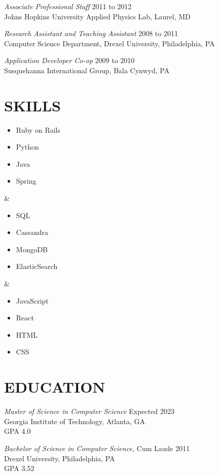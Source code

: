 \documentclass[line]{style}
\begin{document}
\begin{resume}
{\sl Associate Professional Staff} \hfill 2011 to 2012 \\
Johns Hopkins University Applied Physics Lab, Laurel, MD

{\sl Research Assistant and Teaching Assistant} \hfill 2008 to 2011 \\
Computer Science Department, Drexel University, Philadelphia, PA

{\sl Application Developer Co-op} \hfill        2009 to 2010 \\
Susquehanna International Group, Bala Cynwyd, PA

\section{SKILLS}
\begin{ncolumn}{3}
\begin{itemize} \itemsep -2pt
\item Ruby on Rails
\item Python
\item Java
\item Spring
\end{itemize}
&
\begin{itemize} \itemsep -2pt
\item SQL
\item Cassandra
\item MongoDB
\item ElasticSearch
\end{itemize}
&
\begin{itemize} \itemsep -2pt
\item JavaScript
\item React
\item HTML
\item CSS
\end{itemize}
\end{ncolumn}

\section{EDUCATION}
{\sl Master of Science in Computer Science} \hfill Expected 2023 \\
Georgia Institute of Technology, Atlanta, GA \\
GPA 4.0

{\sl Bachelor of Science in Computer Science,} Cum Laude \hfill 2011 \\
Drexel University, Philadelphia, PA \\
GPA 3.52

\end{resume}
\end{document}
